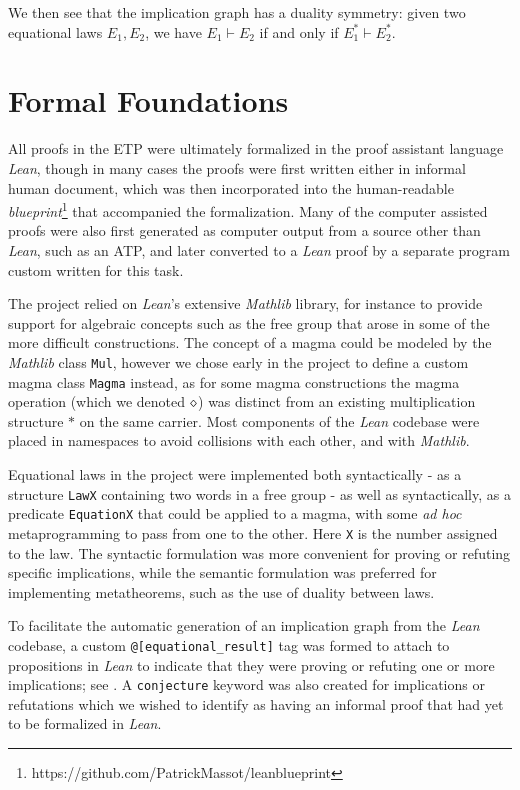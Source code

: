 We then see that the implication graph has a duality symmetry: given two equational laws $E_1,E_2$, we have $E_1 \vdash E_2$ if and only if $E_1^* \vdash E_2^*$.

\section{Formal Foundations}


All proofs in the ETP were ultimately formalized in the proof assistant language \emph{Lean}, though in many cases the proofs were first written either in informal human document, which was then incorporated into the human-readable \emph{blueprint}\footnote{https://github.com/PatrickMassot/leanblueprint} that accompanied the formalization.  Many of the computer assisted proofs were also first generated as computer output from a source other than \emph{Lean}, such as an ATP, and later converted to a \emph{Lean} proof by a separate program custom written for this task.

The project relied on \emph{Lean}'s extensive \emph{Mathlib} library, for instance to provide support for algebraic concepts such as the free group that arose in some of the more difficult constructions.  The concept of a magma could be modeled by the \emph{Mathlib} class \texttt{Mul}, however we chose early in the project to define a custom magma class \texttt{Magma} instead, as for some magma constructions the magma operation (which we denoted $\diamond$) was distinct from an existing multiplication structure $*$ on the same carrier.  Most components of the \emph{Lean} codebase were placed in namespaces to avoid collisions with each other, and with \emph{Mathlib}.

Equational laws in the project were implemented both syntactically - as a structure \texttt{LawX} containing two words in a free group - as well as syntactically, as a predicate \texttt{EquationX} that could be applied to a magma, with some \emph{ad hoc} metaprogramming to pass from one to the other.  Here \texttt{X} is the number assigned to the law.  The syntactic formulation was more convenient for proving or refuting specific implications, while the semantic formulation was preferred for implementing metatheorems, such as the use of duality between laws.

To facilitate the automatic generation of an implication graph from the \emph{Lean} codebase, a custom \texttt{@{[}equational\_result{]}} tag was formed to attach to  propositions in \emph{Lean} to indicate that they were proving or refuting one or more implications; see .  A \texttt{conjecture} keyword was also created for implications or refutations which we wished to identify as having an informal proof that had yet to be formalized in \emph{Lean}.


